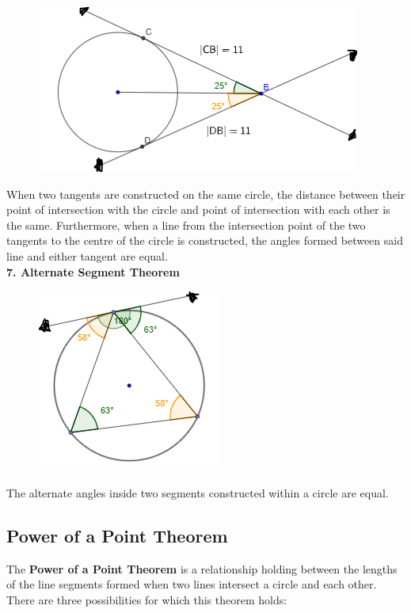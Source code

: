 \documentclass{article}
\begin{document}
            \begin{figure} [hbt!]
                \centering
                \includegraphics[scale=0.75]{Resources/Unit4Circles/circle6.PNG}
            \end{figure}

            \noindent When two tangents are constructed on the same circle, the distance between
            their point of intersection with the circle and point of intersection with each other
            is the same. Furthermore, when a line from the intersection point of the two tangents
            to the centre of the circle is constructed, the angles formed between said line and
            either tangent are equal. \\

            \noindent \color{purple} \textbf{7. Alternate Segment Theorem} \color{black} \\

            \begin{figure} [hbt!]
                \centering
                \includegraphics[scale=0.75]{Resources/Unit4Circles/circle7.PNG}
            \end{figure}

            \noindent The alternate angles inside two segments constructed within a circle are equal.

        \subsection{Power of a Point Theorem}
            The \color{purple} \textbf{Power of a Point Theorem} \color{black} is a relationship
            holding between the lengths of the line segments formed when two lines intersect a circle
            and each other. There are three possibilities for which this theorem holds: \\
\end{document}
